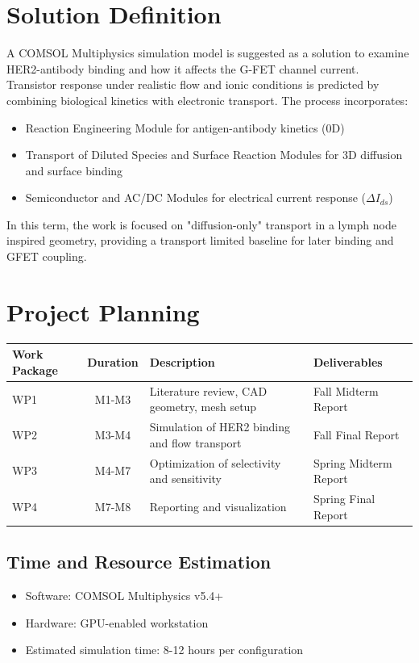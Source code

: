 \documentclass[12pt,a4paper]{report}
\begin{document}
\section{Solution Definition}
A COMSOL Multiphysics simulation model is suggested as a solution to examine HER2-antibody binding and how it affects the G-FET channel current. Transistor response under realistic flow and ionic conditions is predicted by combining biological kinetics with electronic transport. The process incorporates:
\begin{itemize}
  \item Reaction Engineering Module for antigen-antibody kinetics (0D)
  \item Transport of Diluted Species and Surface Reaction Modules for 3D diffusion and surface binding
  \item Semiconductor and AC/DC Modules for electrical current response (\( \Delta I_{ds} \))
\end{itemize}

In this term, the work is focused on "diffusion-only" transport in a lymph node inspired geometry, providing a transport limited baseline for later binding and GFET coupling. 

\section{Project Planning}
\begin{center}
\begin{tabular}{|l|c|p{7cm}|p{4cm}|}
\hline
\textbf{Work Package} & \textbf{Duration} & \textbf{Description} & \textbf{Deliverables} \\
\hline
WP1 & M1-M3& Literature review, CAD geometry, mesh setup & Fall Midterm Report\\
WP2 & M3-M4& Simulation of HER2 binding and flow transport & Fall Final Report\\
WP3 & M4-M7& Optimization of selectivity and sensitivity & Spring Midterm Report \\
WP4 & M7-M8& Reporting and visualization & Spring Final Report\\
\hline
\end{tabular}
\end{center}

\subsection{Time and Resource Estimation}
\begin{itemize}
  \item Software: COMSOL Multiphysics v5.4+
  \item Hardware: GPU-enabled workstation 
  \item Estimated simulation time: 8-12 hours per configuration
\end{itemize}
\end{document}
